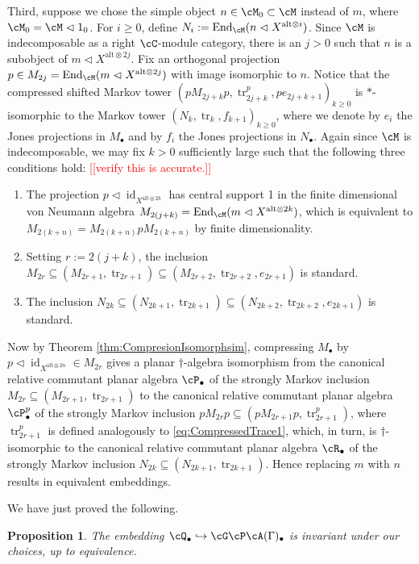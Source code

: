 \documentclass[11pt]{article}
\theoremstyle{plain}
\newtheorem{prop}[thm]{Proposition}
\theoremstyle{definition}
\DeclareMathOperator{\End}{End}
\DeclareMathOperator{\id}{id}
\DeclareMathOperator{\tr}{tr}
\newcommand{\nn}[1]{\textcolor{red}{[[#1]]}}
\begin{document}
Third, suppose we chose the simple object $n\in \cM_0 \subset \cM$ instead of $m$, where $\cM_0 = \cM\vartriangleleft 1_0$.
For $i\geq 0$, define $N_i := \End_\cM(n \vartriangleleft X^{\text{alt}\otimes i})$.
Since $\cM$ is indecomposable as a right $\cC$-module category, there is an $j>0$ such that $n$ is a subobject of $m \vartriangleleft X^{\text{alt}\otimes 2j}$.
Fix an orthogonal projection $p \in M_{2j} = \End_\cM(m \vartriangleleft X^{\text{alt}\otimes 2j})$ with image isomorphic to $n$.
Notice that the compressed shifted Markov tower $(pM_{2j+k}p, \tr_{2j+k}^p, pe_{2j+k+1})_{k\geq 0}$ is $*$-isomorphic to the Markov tower $(N_{k}, \tr_k, f_{k+1})_{k\geq 0}$, where we denote by $e_i$ the Jones projections in $M_\bullet $ and by $f_i$ the Jones projections in $N_\bullet$.
Again since $\cM$ is indecomposable, we may fix $k>0$ sufficiently large such that the following three conditions hold:
\nn{verify this is accurate.}
\begin{enumerate}[label={\rm(\arabic*)}]
\item
The projection $p\vartriangleleft \id_{X^{\text{alt}\otimes 2k}}$ has central support 1 in the finite dimensional von Neumann algebra $M_{2(j+k)} = \End_\cM(m \vartriangleleft X^{\text{alt}\otimes 2k})$, which is equivalent to $M_{2(k+n)} = M_{2(k+n)}p M_{2(k+n)}$ by finite dimensionality.
\item
Setting $r:= 2(j+k)$, the inclusion $M_{2r} \subseteq (M_{2r+1}, \tr_{2r+1}) \subseteq (M_{2r+2}, \tr_{2r+2}, e_{2r+1})$ is standard.
\item
The inclusion $N_{2k} \subseteq (N_{2k+1}, \tr_{2k+1}) \subseteq (N_{2k+2}, \tr_{2k+2}, e_{2k+1})$ is standard.
\end{enumerate}
Now by Theorem \ref{thm:CompresionIsomorphsim}, compressing $M_\bullet$ by $p\vartriangleleft \id_{X^{\text{alt}\otimes 2n}} \in M_{2r}$ gives a planar $\dag$-algebra isomorphism from the canonical relative commutant planar algebra $\cP_\bullet$ of the strongly Markov inclusion $M_{2r} \subseteq (M_{2r+1}, \tr_{2r+1})$ to the 
canonical relative commutant planar algebra $\cP^p_\bullet$ of the strongly Markov inclusion $pM_{2r}p \subseteq (pM_{2r+1}p, \tr^p_{2r+1})$, where $\tr^p_{2r+1}$ is defined analogously to \eqref{eq:CompressedTrace1}, which, in turn, is $\dag$-isomorphic to the canonical relative commutant planar algebra $\cR_\bullet$ of the strongly Markov inclusion $N_{2k} \subseteq (N_{2k+1}, \tr_{2k+1})$.
Hence replacing $m$ with $n$ results in equivalent embeddings. 

We have just proved the following.

\begin{prop}
The embedding $\cQ_\bullet \hookrightarrow \cG\cP\cA(\Gamma)_\bullet$ is invariant under our choices, up to equivalence.
\end{prop}



{\footnotesize{

}}
\end{document}
